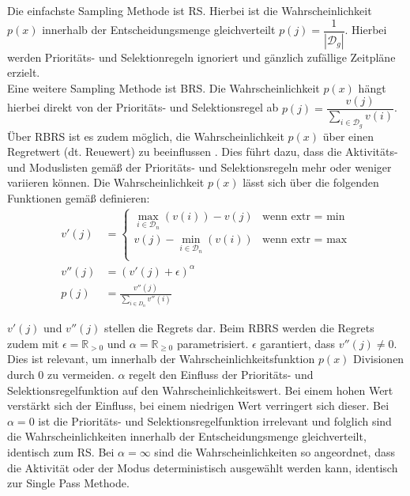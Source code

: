 Die einfachste Sampling Methode ist \ac{RS}. Hierbei ist die Wahrscheinlichkeit $p(x)$ innerhalb der Entscheidungsmenge gleichverteilt $p(j) = \dfrac{1}{|\mathcal{D}_g|}$. \cite[vgl.][S. 7]{kolisch_heuristic_1998} Hierbei werden Prioritäts- und Selektionregeln ignoriert und gänzlich zufällige Zeitpläne erzielt. \\

Eine weitere Sampling Methode ist \ac{BRS}. Die Wahrscheinlichkeit $p(x)$ hängt hierbei direkt von der Prioritäts- und Selektionsregel ab $p(j) = \dfrac{v(j)}{\sum_{i \in \mathcal{D}_g} v(i)}$. \cite[vgl.][S. 7]{kolisch_heuristic_1998} \\

Über \ac{RBRS} ist es zudem möglich, die Wahrscheinlichkeit $p(x)$ über einen Regretwert (dt. Reuewert) zu beeinflussen \cite[vgl.][S. 12]{schirmer_parameterized_1997}. Dies führt dazu, dass die Aktivitäts- und Moduslisten gemäß der Prioritäts- und Selektionsregeln mehr oder weniger variieren können. Die Wahrscheinlichkeit $p(x)$ lässt sich über die folgenden Funktionen gemäß \cite[vgl.][S. 12]{schirmer_parameterized_1997} definieren: 
\begin{align}
    v'(j) &= 
    \left\{\begin{array}{ll} 
        \max_{i \in \mathcal{D}_n}(v(i)) - v(j) & \text{wenn extr = min} \\
        v(j) - \min_{i \in \mathcal{D}_n}(v(i)) & \text{wenn extr = max} \\
     \end{array}\right.  \\
    v''(j) &= (v'(j) + \epsilon)^\alpha  \\
    p(j) &= \frac{v''(j)}{\sum_{i \in D_n} v''(i)}
\end{align}

$v'(j)$ und $v''(j)$ stellen die Regrets dar. Beim \ac{RBRS} werden die Regrets zudem mit $\epsilon = \mathbb{R}_{>0}$ und $\alpha = \mathbb{R}_{\geq0}$ parametrisiert. $\epsilon$ garantiert, dass $v''(j) \neq 0$. Dies ist relevant, um innerhalb der Wahrscheinlichkeitsfunktion $p(x)$ Divisionen durch 0 zu vermeiden. $\alpha$ regelt den Einfluss der Prioritäts- und Selektionsregelfunktion auf den Wahrscheinlichkeitswert. Bei einem hohen Wert verstärkt sich der Einfluss, bei einem niedrigen Wert verringert sich dieser. Bei $\alpha = 0$ ist die Prioritäts- und Selektionsregelfunktion irrelevant und folglich sind die Wahrscheinlichkeiten innerhalb der Entscheidungsmenge gleichverteilt, identisch zum \ac{RS}. Bei $\alpha = \infty$ sind die Wahrscheinlichkeiten so angeordnet, dass die Aktivität oder der Modus deterministisch ausgewählt werden kann, identisch zur Single Pass Methode. \cite[vgl.][S. 12 f.]{schirmer_parameterized_1997} \\

